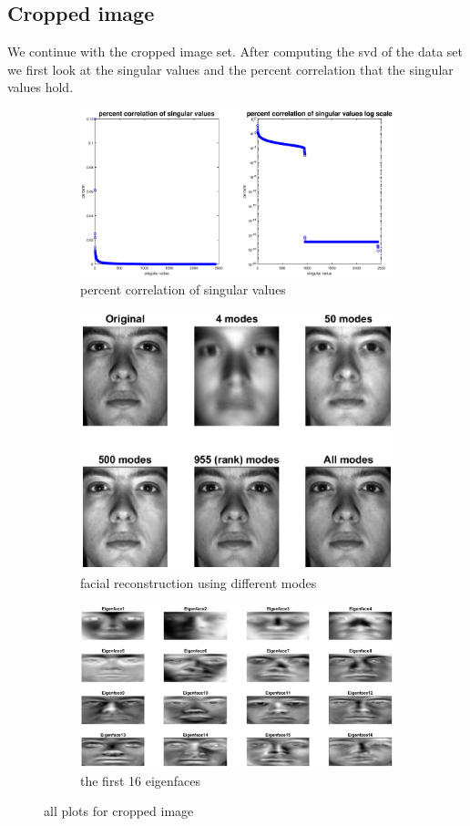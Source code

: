 \documentclass[]{article}
\begin{document}
\subsection{Cropped image}
We continue with the cropped image set. After computing the svd of the data set we first look at the singular values and the percent correlation that the singular values hold.
\begin{figure}[htbp]
	\begin{subfigure}{\linewidth}
		\includegraphics [width=4in]{cPercent.eps}
		\caption{percent correlation of singular values}
	\end{subfigure}	
	\begin{subfigure}{\linewidth}
		\includegraphics [width=4in]{cReconstruction.eps}
		\caption{facial reconstruction using different modes}
	\end{subfigure}
	\begin{subfigure}{\linewidth}
		\includegraphics [width=4in]{cEigenface.eps}
		\caption{the first 16 eigenfaces}
	\end{subfigure}
	\caption{all plots for cropped image}
\end{figure}
\end{document}
